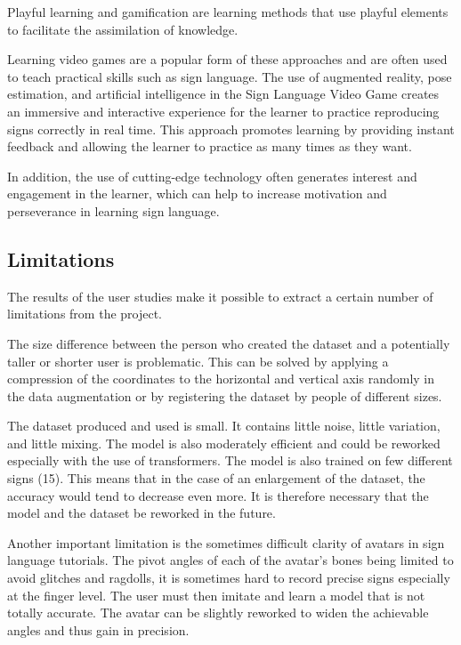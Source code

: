 Playful learning and gamification are learning methods that use playful elements to facilitate the assimilation of knowledge. 

Learning video games are a popular form of these approaches and are often used to teach practical skills such as sign language. The use of augmented reality, pose estimation, and artificial intelligence in the Sign Language Video Game creates an immersive and interactive experience for the learner to practice reproducing signs correctly in real time. This approach promotes learning by providing instant feedback and allowing the learner to practice as many times as they want. 

In addition, the use of cutting-edge technology often generates interest and engagement in the learner, which can help to increase motivation and perseverance in learning sign language.

\subsection{Limitations}

The results of the user studies make it possible to extract a certain number of limitations from the project.

The size difference between the person who created the dataset and a potentially taller or shorter user is problematic. This can be solved by applying a compression of the coordinates to the horizontal and vertical axis randomly in the data augmentation or by registering the dataset by people of different sizes.

The dataset produced and used is small. It contains little noise, little variation, and little mixing. The model is also moderately efficient and could be reworked especially with the use of transformers. The model is also trained on few different signs (15). This means that in the case of an enlargement of the dataset, the accuracy would tend to decrease even more. It is therefore necessary that the model and the dataset be reworked in the future.

Another important limitation is the sometimes difficult clarity of avatars in sign language tutorials. The pivot angles of each of the avatar's bones being limited to avoid glitches and ragdolls, it is sometimes hard to record precise signs especially at the finger level. The user must then imitate and learn a model that is not totally accurate. The avatar can be slightly reworked to widen the achievable angles and thus gain in precision.

